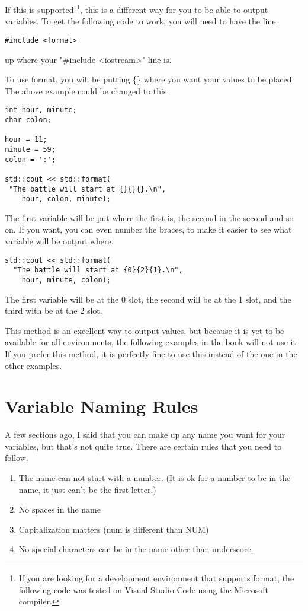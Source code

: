 If this is supported \footnote{If you are looking for a development
environment that supports format, the following code 
was tested on Visual Studio Code using the Microsoft compiler.}, this is a different way for you to be able
to output variables. To get the following code to work,
you will need to have the line:
\begin{lstlisting}
#include <format>  
\end{lstlisting}
up where your "\#include \textless iostream\textgreater" line is.

To use format, you will be putting \{\} where you want your values
to be placed. The above example could be changed to this:
\begin{lstlisting}
int hour, minute;
char colon;

hour = 11;
minute = 59;
colon = ':';

std::cout << std::format(
 "The battle will start at {}{}{}.\n", 
    hour, colon, minute);
\end{lstlisting}
The first variable will be put where the first {} is, the second in
the second {} and so on. If you want, you can even number the 
braces, to make it easier to see what variable will be output where.
\begin{lstlisting}
std::cout << std::format(
  "The battle will start at {0}{2}{1}.\n", 
    hour, minute, colon);  
\end{lstlisting}
The first variable will be at the 0 slot, the second will be at the
1 slot, and the third with be at the 2 slot. 

This method is an excellent way to output values, but because it is yet to be available
for all environments, the following examples in the book will not use it. If you prefer this method, it is perfectly fine to use this instead of the one in the other examples.

\section{Variable Naming Rules}
A few sections ago, I said that you can make up any name you
want for your variables, but that's not quite true. There are certain rules that you need to follow.
\begin{enumerate}
    \item The name can not start with a number. (It is ok for a number to be in the name, it just can't be the first letter.)
    \item No spaces in the name
    \item Capitalization matters (num is different than NUM) 
    \item No special characters can be in the name other than underscore.
\end{enumerate}

